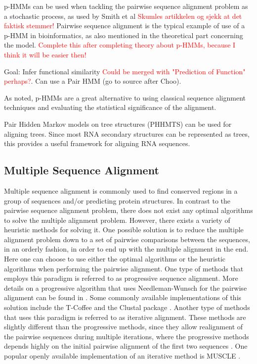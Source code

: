 \documentclass{article}
\begin{document}
p-HMMs can be used when tackling the pairwise sequence alignment problem as a stochastic process, as used by Smith et al \cite{Smith2003} \textcolor{red}{Skumles artikkelen og sjekk at det faktisk stemmer!} Pairwise sequence alignment is the typical example of use of a p-HMM in bioinformatics, as also mentioned in the theoretical part concerning the model. \textcolor{red}{Complete this after completing theory about p-HMMs, because I think it will be easier then!}

Goal: Infer functional similarity \textcolor{red}{Could be merged with "Prediction of Function" perhaps?}. Can use a Pair HMM \cite{Choo2004} (go to source after Choo). 

As noted, p-HMMs are a great alternative to using classical sequence alignment techniques and evaluating the statistical significance of the alignment. 

Pair Hidden Markov models on tree structures (PHHMTS) can be used for aligning trees. Since most RNA secondary structures can be represented as trees, this provides a useful framework for aligning RNA sequences. 

\subsection{Multiple Sequence Alignment}
Multiple sequence alignment is commonly used to find conserved regions in a group of sequences and/or predicting protein structures. In contrast to the pairwise sequence alignment problem, there does not exist any optimal algorithms to solve the multiple alignment problem. However, there exists a variety of heuristic methods for solving it. One possible solution is to reduce the multiple alignment problem down to a set of pairwise comparisons between the sequences, in an orderly fashion, in order to end up with the multiple alignment in the end. Here one can choose to use either the optimal algorithms or the heuristic algorithms when performing the pairwise alignment. One type of methods that employs this paradigm is referred to as progressive sequence alignment. More details on a progressive algorithm that uses Needleman-Wunsch for the pairwise alignment can be found in \cite{Feng1987}. Some commonly available implementations of this solution include the T-Coffee and the Clustal package \cite{EMBL-EBI-Multiple}. Another type of methods that uses this paradigm is referred to as iterative alignment. These methods are slightly different than the progressive methods, since they allow realignment of the pairwise sequences during multiple iterations, where the progressive methods depends highly on the initial pairwise alignment of the first two sequences \cite{BioInfoOrgMSA}. One popular openly available implementation of an iterative method is MUSCLE \cite{EMBL-EBI-Multiple}. 
\end{document}
